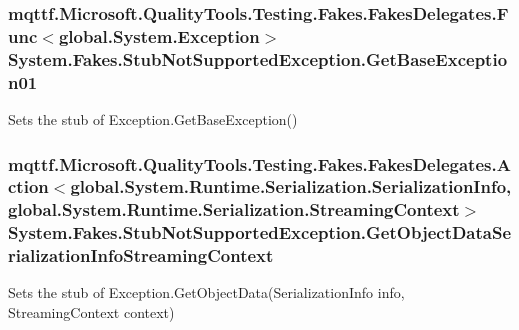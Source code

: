 \hypertarget{class_system_1_1_fakes_1_1_stub_not_supported_exception_a38b92de3e3a5e2686d3210b700663147}{
\subsubsection[{Get\-Base\-Exception01}]{\setlength{\rightskip}{0pt plus 5cm}mqttf.\-Microsoft.\-Quality\-Tools.\-Testing.\-Fakes.\-Fakes\-Delegates.\-Func$<$global.\-System.\-Exception$>$ System.\-Fakes.\-Stub\-Not\-Supported\-Exception.\-Get\-Base\-Exception01}}\label{class_system_1_1_fakes_1_1_stub_not_supported_exception_a38b92de3e3a5e2686d3210b700663147}


Sets the stub of Exception.\-Get\-Base\-Exception()

\hypertarget{class_system_1_1_fakes_1_1_stub_not_supported_exception_af1ce17480c5b47ab848e8beb37802551}{
\subsubsection[{Get\-Object\-Data\-Serialization\-Info\-Streaming\-Context}]{\setlength{\rightskip}{0pt plus 5cm}mqttf.\-Microsoft.\-Quality\-Tools.\-Testing.\-Fakes.\-Fakes\-Delegates.\-Action$<$global.\-System.\-Runtime.\-Serialization.\-Serialization\-Info, global.\-System.\-Runtime.\-Serialization.\-Streaming\-Context$>$ System.\-Fakes.\-Stub\-Not\-Supported\-Exception.\-Get\-Object\-Data\-Serialization\-Info\-Streaming\-Context}}\label{class_system_1_1_fakes_1_1_stub_not_supported_exception_af1ce17480c5b47ab848e8beb37802551}


Sets the stub of Exception.\-Get\-Object\-Data(\-Serialization\-Info info, Streaming\-Context context)

